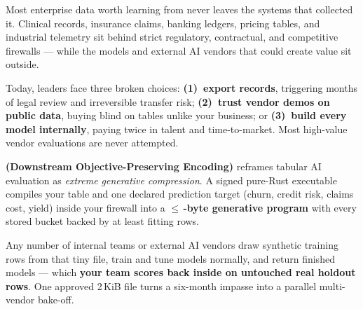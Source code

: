 \documentclass[8.8pt,letterpaper]{article}
\begin{document}
\noindent
\begin{minipage}[t]{0.486\textwidth}
  \vspace{0pt}
  {\fontsize{8.45}{10.5}\selectfont
  Most enterprise data worth learning from never leaves the systems that collected it. Clinical records, insurance claims, banking ledgers, pricing tables, and industrial telemetry sit behind strict regulatory, contractual, and competitive firewalls --- while the models and external AI vendors that could create value sit outside.

  \vspace{2.5pt}
  Today, leaders face three broken choices: \textbf{(1)~export records}, triggering months of legal review and irreversible transfer risk; \textbf{(2)~trust vendor demos on public data}, buying blind on tables unlike your business; or \textbf{(3)~build every model internally}, paying twice in talent and time-to-market. Most high-value vendor evaluations are never attempted.
  }
\end{minipage}\hfill
\begin{minipage}[t]{0.486\textwidth}
  \vspace{0pt}
  {\fontsize{8.45}{10.5}\selectfont
  \textbf{\wordmark{} (Downstream Objective-Preserving Encoding)} reframes tabular AI evaluation as \emph{extreme generative compression}. A signed pure-Rust executable compiles your table and one declared prediction target (churn, credit risk, claims cost, yield) inside your firewall into a \textbf{$\le$\,-byte generative program} with every stored bucket backed by at least  fitting rows.

  \vspace{2.5pt}
  Any number of internal teams or external AI vendors draw synthetic training rows from that tiny file, train and tune models normally, and return finished models --- which \textbf{your team scores back inside on untouched real holdout rows}. One approved 2\,KiB file turns a six-month impasse into a parallel multi-vendor bake-off.
  }
\end{minipage}

\vspace{6pt}
\end{document}
